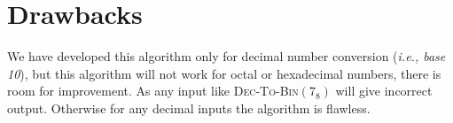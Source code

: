 \documentclass[12pt,a4paper]{article}%
\begin{document}
	\section{Drawbacks}
	\begin{flushleft}
		We have developed this algorithm only for decimal number conversion (\textit{i.e., base 10}), but this algorithm will not work for octal or hexadecimal numbers, there is room for improvement. As any input like \textsc{Dec-To-Bin}$(7_8)$ will give incorrect output. Otherwise for any decimal inputs the algorithm is flawless.
	\end{flushleft}
	
\end{document}
